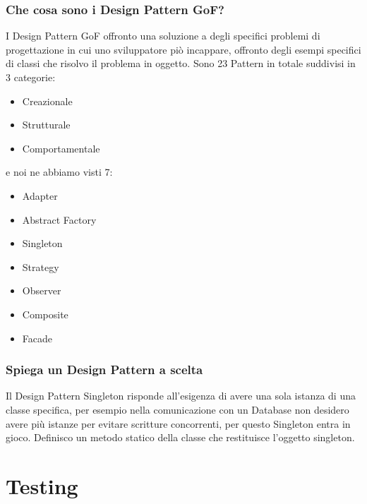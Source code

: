 \documentclass[12pt, a4paper, openany]{book}
\begin{document}
\subsection*{Che cosa sono i Design Pattern GoF?}
I Design Pattern GoF offronto una soluzione a degli specifici problemi di progettazione
in cui uno sviluppatore piò incappare, offronto degli esempi specifici di classi che risolvo
il problema in oggetto. Sono 23 Pattern in totale suddivisi in 3 categorie:
\begin{itemize}
    \item Creazionale
    \item Strutturale
    \item Comportamentale
\end{itemize}
e noi ne abbiamo visti 7:
\begin{itemize}
    \item Adapter
    \item Abstract Factory
    \item Singleton
    \item Strategy
    \item Observer
    \item Composite
    \item Facade
\end{itemize}

\subsection*{Spiega un Design Pattern a scelta}
Il Design Pattern Singleton risponde all'esigenza di avere una sola istanza
di una classe specifica, per esempio nella comunicazione con un Database non desidero
avere più istanze per evitare scritture concorrenti, per questo Singleton entra in gioco.
Definisco un metodo statico della classe che restituisce l'oggetto singleton.\\

\chapter{Testing}
\end{document}
